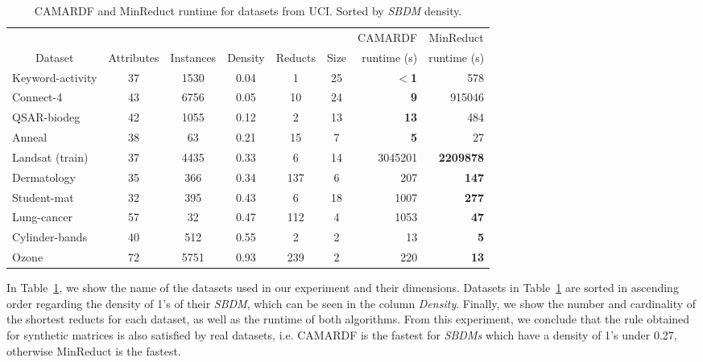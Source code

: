 \documentclass[authoryear,preprint,review,12pt]{elsarticle}
\begin{document}
		\begin{table}[htb]
			\centering
			\caption{CAMARDF and MinReduct runtime for datasets from UCI. Sorted by \textit{SBDM} density.}
			\label{tab:density}
			\begin{tabular}{|l|c|c|c|c|c|r|r|}
				\hline
				&&&&&& \multicolumn{1}{c|}{CAMARDF} & \multicolumn{1}{c|}{MinReduct}  \\
				\multicolumn{1}{|c|}{Dataset}       & Attributes & Instances & Density & Reducts & Size & runtime (s)  & runtime (s)  \\
				\hline
				Keyword-activity          & 37 & 1530   & 0.04    & 1   & 25 & \textbf{$<$1} & 578  \\
				Connect-4                 & 43 & 6756   & 0.05    & 10  & 24 & \textbf{9}    &  915046 \\
				QSAR-biodeg               & 42 & 1055   & 0.12    & 2   & 13 & \textbf{13}   & 484 \\
				Anneal                    & 38 & 63     & 0.21    & 15  & 7  & \textbf{5}    & 27 \\
				Landsat (train)           & 37 & 4435   & 0.33    & 6   & 14 & 3045201       & \textbf{2209878} \\
				Dermatology               & 35 & 366    & 0.34    & 137 & 6  & 207           & \textbf{147}   \\
				Student-mat               & 32 & 395    & 0.43    & 6   & 18 & 1007          & \textbf{277}  \\
				Lung-cancer               & 57 & 32     & 0.47    & 112 & 4  & 1053          & \textbf{47}   \\
				Cylinder-bands            & 40 & 512    & 0.55    & 2   & 2  & 13            & \textbf{5}   \\
				Ozone                     & 72 & 5751   & 0.93    & 239 & 2  & 220           & \textbf{13}   \\
				\hline
			\end{tabular}
		\end{table}   
				
	  In Table~\ref{tab:density}, we show the name of the datasets used in our experiment and their dimensions. Datasets in Table~\ref{tab:density} are sorted in ascending order regarding the density of 1's of their \textit{SBDM}, which can be seen in the column \textit{Density}. Finally, we show the number and cardinality of the shortest reducts for each dataset, as well as the runtime of both algorithms. From this experiment, we conclude that the rule obtained for synthetic matrices is also satisfied by real datasets, i.e. CAMARDF is the fastest for \textit{SBDMs} which have a density of 1's under 0.27, otherwise MinReduct is the fastest.
	  
\end{document}

